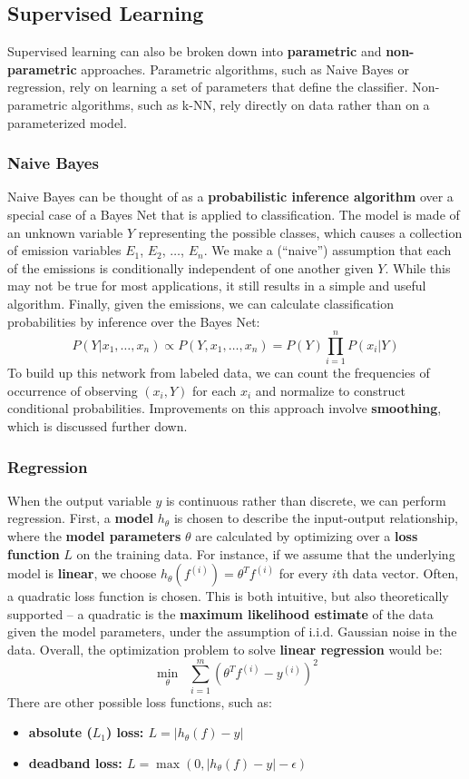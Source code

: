 \documentclass[11pt]{article}
\begin{document}
\subsection{Supervised Learning}
Supervised learning can also be broken down into {\bf{parametric}} and {\bf{non-parametric}} approaches. Parametric algorithms, such as Naive Bayes or regression, rely on learning a set of parameters that define the classifier. Non-parametric algorithms, such as k-NN, rely directly on data rather than on a parameterized model. 

\subsubsection*{Naive Bayes}
Naive Bayes can be thought of as a {\bf{probabilistic inference algorithm}} over a special case of a Bayes Net that is applied to classification. The model is made of an unknown variable $Y$ representing the possible classes, which causes a collection of emission variables $E_1$, $E_2$, $\dots$, $E_n$. We make a (``naive'') assumption that each of the emissions is conditionally independent of one another given $Y$. While this may not be true for most applications, it still results in a simple and useful algorithm. Finally, given the emissions, we can calculate classification probabilities by inference over the Bayes Net:
\[
P(Y | x_1, \ldots, x_n) \propto P(Y, x_1, \ldots, x_n) = P(Y) \prod_{i=1}^n P(x_i|Y)
\]
To build up this network from labeled data, we can count the frequencies of occurrence of observing $(x_i, Y)$ for each $x_i$ and normalize to construct conditional probabilities. Improvements on this approach involve {\bf{smoothing}}, which is discussed further down.

\subsubsection*{Regression}
When the output variable $y$ is continuous rather than discrete, we can perform regression. First, a {\bf{model}} $h_{\theta}$ is chosen to describe the input-output relationship, where the {\bf{model parameters}} $\theta$ are calculated by optimizing over a {\bf{loss function}} $L$ on the training data. For instance, if we assume that the underlying model is {\bf{linear}}, we choose $h_{\theta}(f^{(i)}) = \theta^T f^{(i)}$ for every $i$th data vector. Often, a quadratic loss function is chosen. This is both intuitive, but also theoretically supported -- a quadratic is the {\bf{maximum likelihood estimate}} of the data given the model parameters, under the assumption of i.i.d. Gaussian noise in the data. Overall, the optimization problem to solve {\bf{linear regression}} would be:
\[
\min_{\theta} \; \; \sum_{i = 1}^m (\theta^T f^{(i)} - y^{(i)})^2
\]
There are other possible loss functions, such as:
\begin{itemize}
    \item \bf{absolute ($L_1$) loss}: $L = |h_{\theta}(f) - y|$
    \item \bf{deadband loss}: $L = \max(0, |h_{\theta}(f) - y| - \epsilon)$
\end{itemize}
\end{document}
